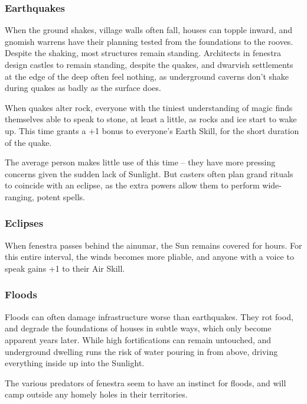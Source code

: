 \begin{multicols}{2}
\subsubsection{Earthquakes}

When the ground shakes, \gls{village} walls often fall, houses can topple inward, and gnomish warrens have their planning tested from the foundations to the rooves.
Despite the shaking, most structures remain standing.
Architects in \gls{fenestra} design castles to remain standing, despite the quakes, and dwarvish settlements at the edge of the \gls{deep} often feel nothing, as underground caverns don't shake during quakes as badly as the surface does.

When quakes alter rock, everyone with the tiniest understanding of magic finds themselves able to speak to stone, at least a little, as rocks and ice start to wake up.
This time grants a +1 bonus to everyone's Earth Skill, for the short duration of the quake.

The average person makes little use of this time -- they have more pressing concerns given the sudden lack of Sunlight.
But casters often plan grand rituals to coincide with an eclipse, as the extra powers allow them to perform wide-ranging, potent spells.

\subsubsection{Eclipses}

When \gls{fenestra} passes behind the \gls{ainumar}, the Sun remains covered for hours.
For this entire \gls{interval}, the winds becomes more pliable, and anyone with a voice to speak gains +1 to their Air Skill.

\subsubsection{Floods}

Floods can often damage infrastructure worse than earthquakes.
They rot food, and degrade the foundations of houses in subtle ways, which only become apparent years later.
While high fortifications can remain untouched, and underground dwelling runs the risk of water pouring in from above, driving everything inside up into the Sunlight.

The various predators of \gls{fenestra} seem to have an instinct for floods, and will camp outside any homely holes in their territories.


\end{multicols}
